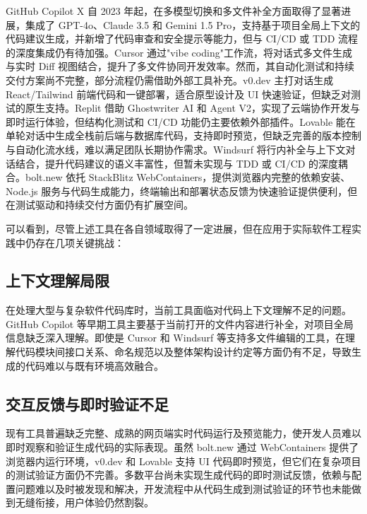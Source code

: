 GitHub Copilot X 自 2023 年起，在多模型切换和多文件补全方面取得了显著进展，集成了 GPT-4o、Claude 3.5 和 Gemini 1.5 Pro，支持基于项目全局上下文的代码建议生成，并新增了代码审查和安全提示等能力，但与 CI/CD 或 TDD 流程的深度集成仍有待加强\cite{copilotx2023}。Cursor 通过"vibe coding"工作流，将对话式多文件生成与实时 Diff 视图结合，提升了多文件协同开发效率。然而，其自动化测试和持续交付方案尚不完整，部分流程仍需借助外部工具补充\cite{cursor2025wiki}。v0.dev 主打对话生成 React/Tailwind 前端代码和一键部署，适合原型设计及 UI 快速验证，但缺乏对测试的原生支持\cite{v0dev2024}。Replit 借助 Ghostwriter AI 和 Agent V2，实现了云端协作开发与即时运行体验，但结构化测试和 CI/CD 功能仍主要依赖外部插件\cite{replit2025wiki}。Lovable 能在单轮对话中生成全栈前后端与数据库代码，支持即时预览，但缺乏完善的版本控制与自动化流水线，难以满足团队长期协作需求\cite{lovable2025times}。Windsurf 将行内补全与上下文对话结合，提升代码建议的语义丰富性，但暂未实现与 TDD 或 CI/CD 的深度耦合\cite{windsurf2024}。bolt.new 依托 StackBlitz WebContainers，提供浏览器内完整的依赖安装、Node.js 服务与代码生成能力，终端输出和部署状态反馈为快速验证提供便利，但在测试驱动和持续交付方面仍有扩展空间\cite{arunachalam2024boltnew,boltnewgithub2024}。

可以看到，尽管上述工具在各自领域取得了一定进展，但在应用于实际软件工程实践中仍存在几项关键挑战：

\subsection{上下文理解局限}

在处理大型与复杂软件代码库时，当前工具面临对代码上下文理解不足的问题。GitHub Copilot 等早期工具主要基于当前打开的文件内容进行补全，对项目全局信息缺乏深入理解。即使是 Cursor 和 Windsurf 等支持多文件编辑的工具，在理解代码模块间接口关系、命名规范以及整体架构设计约定等方面仍有不足，导致生成的代码难以与既有环境高效融合。

\subsection{交互反馈与即时验证不足}

现有工具普遍缺乏完整、成熟的网页端实时代码运行及预览能力，使开发人员难以即时观察和验证生成代码的实际表现。虽然 bolt.new 通过 WebContainers 提供了浏览器内运行环境，v0.dev 和 Lovable 支持 UI 代码即时预览，但它们在复杂项目的测试验证方面仍不完善。多数平台尚未实现生成代码的即时测试反馈，依赖与配置问题难以及时被发现和解决，开发流程中从代码生成到测试验证的环节也未能做到无缝衔接，用户体验仍然割裂。

